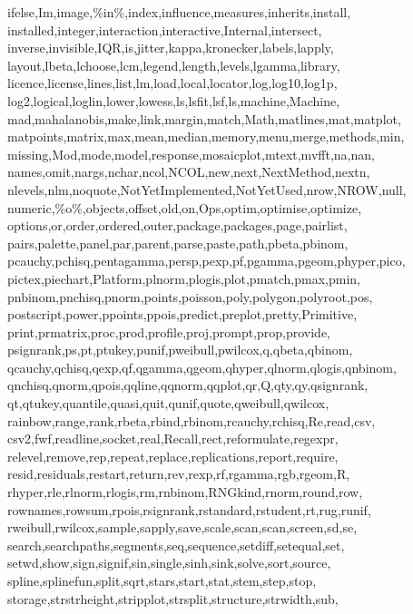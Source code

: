 {{            ifelse,Im,image,\%in\%,index,influence,measures,inherits,install,%
            installed,integer,interaction,interactive,Internal,intersect,%
            inverse,invisible,IQR,is,jitter,kappa,kronecker,labels,lapply,%
            layout,lbeta,lchoose,lcm,legend,length,levels,lgamma,library,%
            licence,license,lines,list,lm,load,local,locator,log,log10,log1p,%
            log2,logical,loglin,lower,lowess,ls,lsfit,lsf,ls,machine,Machine,%
            mad,mahalanobis,make,link,margin,match,Math,matlines,mat,matplot,%
            matpoints,matrix,max,mean,median,memory,menu,merge,methods,min,%
            missing,Mod,mode,model,response,mosaicplot,mtext,mvfft,na,nan,%
            names,omit,nargs,nchar,ncol,NCOL,new,next,NextMethod,nextn,%
            nlevels,nlm,noquote,NotYetImplemented,NotYetUsed,nrow,NROW,null,%
            numeric,\%o\%,objects,offset,old,on,Ops,optim,optimise,optimize,%
            options,or,order,ordered,outer,package,packages,page,pairlist,%
            pairs,palette,panel,par,parent,parse,paste,path,pbeta,pbinom,%
            pcauchy,pchisq,pentagamma,persp,pexp,pf,pgamma,pgeom,phyper,pico,%
            pictex,piechart,Platform,plnorm,plogis,plot,pmatch,pmax,pmin,%
            pnbinom,pnchisq,pnorm,points,poisson,poly,polygon,polyroot,pos,%
            postscript,power,ppoints,ppois,predict,preplot,pretty,Primitive,%
            print,prmatrix,proc,prod,profile,proj,prompt,prop,provide,%
            psignrank,ps,pt,ptukey,punif,pweibull,pwilcox,q,qbeta,qbinom,%
            qcauchy,qchisq,qexp,qf,qgamma,qgeom,qhyper,qlnorm,qlogis,qnbinom,%
            qnchisq,qnorm,qpois,qqline,qqnorm,qqplot,qr,Q,qty,qy,qsignrank,%
            qt,qtukey,quantile,quasi,quit,qunif,quote,qweibull,qwilcox,%
            rainbow,range,rank,rbeta,rbind,rbinom,rcauchy,rchisq,Re,read,csv,%
            csv2,fwf,readline,socket,real,Recall,rect,reformulate,regexpr,%
            relevel,remove,rep,repeat,replace,replications,report,require,%
            resid,residuals,restart,return,rev,rexp,rf,rgamma,rgb,rgeom,R,%
            rhyper,rle,rlnorm,rlogis,rm,rnbinom,RNGkind,rnorm,round,row,%
            rownames,rowsum,rpois,rsignrank,rstandard,rstudent,rt,rug,runif,%
            rweibull,rwilcox,sample,sapply,save,scale,scan,scan,screen,sd,se,%
            search,searchpaths,segments,seq,sequence,setdiff,setequal,set,%
            setwd,show,sign,signif,sin,single,sinh,sink,solve,sort,source,%
            spline,splinefun,split,sqrt,stars,start,stat,stem,step,stop,%
            storage,strstrheight,stripplot,strsplit,structure,strwidth,sub,%
}}
